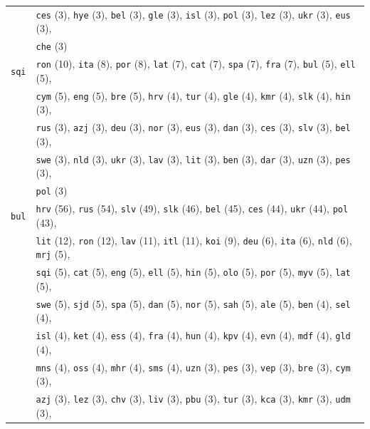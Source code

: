 \begin{center}
\begin{longtable}{ll}
 & \texttt{ces} (3), \texttt{hye} (3), \texttt{bel} (3), \texttt{gle} (3), \texttt{isl} (3), \texttt{pol} (3), \texttt{lez} (3), \texttt{ukr} (3), \texttt{eus} (3), \\
 & \texttt{che} (3) \\
\texttt{sqi} & \texttt{ron} (10), \texttt{ita} (8), \texttt{por} (8), \texttt{lat} (7), \texttt{cat} (7), \texttt{spa} (7), \texttt{fra} (7), \texttt{bul} (5), \texttt{ell} (5), \\
 & \texttt{cym} (5), \texttt{eng} (5), \texttt{bre} (5), \texttt{hrv} (4), \texttt{tur} (4), \texttt{gle} (4), \texttt{kmr} (4), \texttt{slk} (4), \texttt{hin} (3), \\
 & \texttt{rus} (3), \texttt{azj} (3), \texttt{deu} (3), \texttt{nor} (3), \texttt{eus} (3), \texttt{dan} (3), \texttt{ces} (3), \texttt{slv} (3), \texttt{bel} (3), \\
 & \texttt{swe} (3), \texttt{nld} (3), \texttt{ukr} (3), \texttt{lav} (3), \texttt{lit} (3), \texttt{ben} (3), \texttt{dar} (3), \texttt{uzn} (3), \texttt{pes} (3), \\
 & \texttt{pol} (3) \\
\texttt{bul} & \texttt{hrv} (56), \texttt{rus} (54), \texttt{slv} (49), \texttt{slk} (46), \texttt{bel} (45), \texttt{ces} (44), \texttt{ukr} (44), \texttt{pol} (43),\\
 & \texttt{lit} (12), \texttt{ron} (12), \texttt{lav} (11), \texttt{itl} (11), \texttt{koi} (9), \texttt{deu} (6), \texttt{ita} (6), \texttt{nld} (6), \texttt{mrj} (5),\\
 & \texttt{sqi} (5), \texttt{cat} (5), \texttt{eng} (5), \texttt{ell} (5), \texttt{hin} (5), \texttt{olo} (5), \texttt{por} (5), \texttt{myv} (5), \texttt{lat} (5),\\
 & \texttt{swe} (5), \texttt{sjd} (5), \texttt{spa} (5), \texttt{dan} (5), \texttt{nor} (5), \texttt{sah} (5), \texttt{ale} (5), \texttt{ben} (4), \texttt{sel} (4),\\
 & \texttt{isl} (4), \texttt{ket} (4), \texttt{ess} (4), \texttt{fra} (4), \texttt{hun} (4), \texttt{kpv} (4), \texttt{evn} (4), \texttt{mdf} (4), \texttt{gld} (4),\\
 & \texttt{mns} (4), \texttt{oss} (4), \texttt{mhr} (4), \texttt{sms} (4), \texttt{uzn} (3), \texttt{pes} (3), \texttt{vep} (3), \texttt{bre} (3), \texttt{cym} (3),\\
 & \texttt{azj} (3), \texttt{lez} (3), \texttt{chv} (3), \texttt{liv} (3), \texttt{pbu} (3), \texttt{tur} (3), \texttt{kca} (3), \texttt{kmr} (3), \texttt{udm} (3),\\

\end{longtable}
\end{center}
